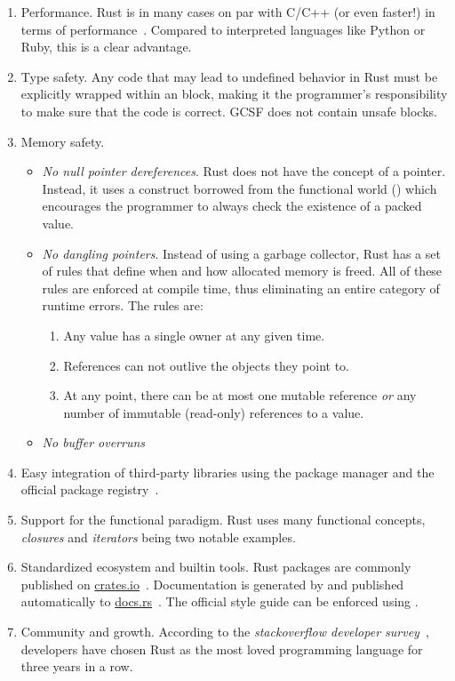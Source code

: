 \begin{enumerate}
  \itemsep0em
  \item Performance. Rust is in many cases on par with C/C++ (or even faster!) in terms of performance~\cite{rust_vs_cpp_benchmark}. Compared to interpreted languages like Python or Ruby, this is a clear advantage.
  \item Type safety. Any code that may lead to undefined behavior in Rust must be explicitly wrapped within an  block, making it the programmer's responsibility to make sure that the code is correct. GCSF does not contain unsafe blocks.
  \item Memory safety.
    \begin{itemize}
      \itemsep0em
      \item \emph{No null pointer dereferences}. Rust does not have the concept of a  pointer. Instead, it uses a construct borrowed from the functional world () which encourages the programmer to always check the existence of a packed value.
      \item \emph{No dangling pointers}. Instead of using a garbage collector, Rust has a set of rules that define when and how allocated memory is freed. All of these rules are enforced at compile time, thus eliminating an entire category of runtime errors. The rules are:
      \begin{enumerate}
        \itemsep0em
        \item Any value has a single owner at any given time.
        \item References can not outlive the objects they point to.
        \item At any point, there can be at most one mutable reference \emph{or} any number of immutable (read-only) references to a value.
      \end{enumerate}
      \item \emph{No buffer overruns}
    \end{itemize}
  \item Easy integration of third-party libraries using the  package manager and the official package registry~\cite{crates_io}.
  \item Support for the functional paradigm. Rust uses many functional concepts, \emph{closures} and \emph{iterators} being two notable examples.
  \item Standardized ecosystem and builtin tools. Rust packages are commonly published on \url{crates.io}~\cite{crates_io}. Documentation is generated by  and published automatically to \url{docs.rs}~\cite{docs_rs}. The official style guide can be enforced using .
  \item Community and growth. According to the \emph{stackoverflow developer survey}~\cite{stack_overflow_most_loved}, developers have chosen Rust as the most loved programming language for three years in a row.
\end{enumerate}

